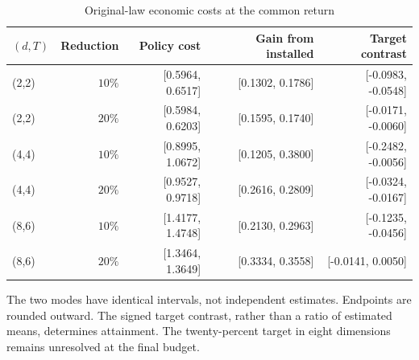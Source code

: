 \begin{table}[htbp]\centering
\caption{Original-law economic costs at the common return}\label{tab:matched-cost59}
{\small\setlength{\tabcolsep}{3pt}\begin{tabular}{lrrrr}
\hline
$(d,T)$ & Reduction & Policy cost & Gain from installed & Target contrast \\
\hline
(2,2) & $10\%$ & [0.5964, 0.6517] & [0.1302, 0.1786] & [-0.0983, -0.0548] \\
(2,2) & $20\%$ & [0.5984, 0.6203] & [0.1595, 0.1740] & [-0.0171, -0.0060] \\
(4,4) & $10\%$ & [0.8995, 1.0672] & [0.1205, 0.3800] & [-0.2482, -0.0056] \\
(4,4) & $20\%$ & [0.9527, 0.9718] & [0.2616, 0.2809] & [-0.0324, -0.0167] \\
(8,6) & $10\%$ & [1.4177, 1.4748] & [0.2130, 0.2963] & [-0.1235, -0.0456] \\
(8,6) & $20\%$ & [1.3464, 1.3649] & [0.3334, 0.3558] & [-0.0141, 0.0050] \\
\hline\end{tabular}}\par\smallskip
{\footnotesize The two modes have identical intervals, not independent estimates. Endpoints are rounded outward. The signed target contrast, rather than a ratio of estimated means, determines attainment. The twenty-percent target in eight dimensions remains unresolved at the final budget.}
\end{table}
